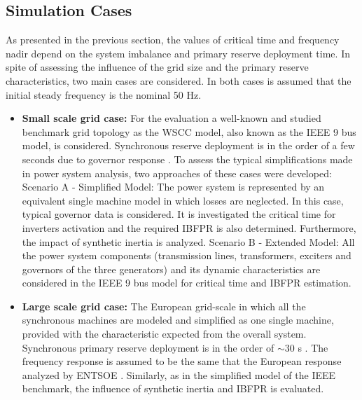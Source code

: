 \subsection{Simulation Cases}

As presented in the previous section, the values of critical time and frequency nadir depend on the system imbalance and primary reserve deployment time. In spite of assessing the influence of the grid size and the primary reserve characteristics, two main cases are considered. In both cases is assumed that the initial steady frequency is the nominal 50 Hz.


\begin{itemize}[leftmargin=*,labelsep=5.8mm]
	\item \textbf{Small scale grid case:} For the evaluation a well-known and studied benchmark grid topology as the WSCC model, also known as the IEEE 9 bus model, is considered. Synchronous reserve deployment is in the order of a few seconds due to governor response \cite{kundur1994power, sundaram2008comparing}. To assess the typical simplifications made in power system analysis, two approaches of these cases were developed:
	\subitem Scenario A - Simplified Model: The power system is represented by an equivalent single machine model in which losses are neglected. In this case, typical governor data is considered. It is investigated the critical time for inverters activation and the required IBFPR is also determined. Furthermore, the impact of synthetic inertia is analyzed.
	\subitem Scenario B - Extended Model: All the power system components (transmission lines, transformers, exciters and governors of the three generators) and its dynamic characteristics are considered in the IEEE 9 bus model for critical time and IBFPR estimation.\\
	\item \textbf{Large scale grid case:} The European grid-scale in which all the synchronous machines are modeled and simplified as one single machine, provided with the characteristic expected from the overall system. Synchronous primary reserve deployment is in the order of $ \sim30 $ s \cite{ENTSOE.2016, hultholm2015optimal}. The frequency response is assumed to be the same that the European response analyzed by ENTSOE \cite{ENTSOE.2016}. Similarly, as in the simplified model of the IEEE benchmark, the influence of synthetic inertia and IBFPR is evaluated.
\end{itemize}

